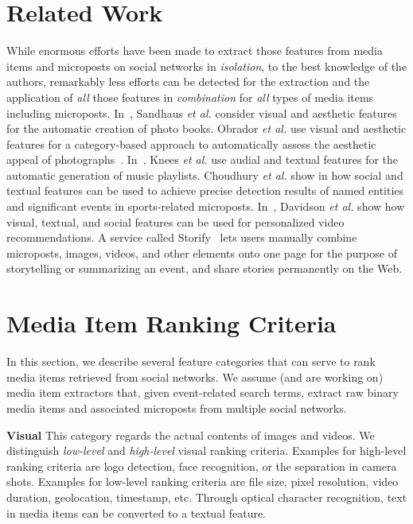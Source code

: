 \documentclass{article}
\begin{document}
\section{Related Work}
While enormous efforts have been made to extract those features
from media items and microposts on social networks in \emph{isolation},
to the best knowledge of the authors, remarkably less efforts 
can be detected for the extraction and the application
of \emph{all} those features in \emph{combination}
for \emph{all} types of media items including microposts.
In~\cite{Photo2011}, Sandhaus \emph{et al.} consider visual and
aesthetic features for the automatic creation of photo books.
Obrador \emph{et al.} use visual and aesthetic features
for a category-based approach to automatically assess
the aesthetic appeal of photographs~\cite{Photo2012}.
In~\cite{Playlist2006}, Knees \emph{et al.} use audial and textual
features for the automatic generation of music playlists.
Choudhury \emph{et al.} show in \cite{Sports2011} how social and textual
features can be used to achieve precise detection results 
of named entities and significant events in sports-related microposts.
In~\cite{YouTube2010}, Davidson \emph{et al.} show how visual,
textual, and social features can be used for personalized video recommendations.
A service called Storify~\cite{Storify2011} lets users manually combine
microposts, images, videos, and other elements onto one page for the purpose
of storytelling or summarizing an event,
and share stories permanently on the Web.

\section{Media Item Ranking Criteria}
In this section, we describe several feature categories that can serve to rank
media items retrieved from social networks. 
We assume (and are working on) media item extractors that,
given event-related search terms,
extract raw binary media items and associated microposts
from multiple social networks.

\noindent \textbf{Visual}
This category regards the actual contents of images and videos.
We distinguish \emph{low-level} and \emph{high-level} visual ranking criteria.
Examples for high-level ranking criteria are logo detection,
face recognition, or the separation in camera shots.
Examples for low-level ranking criteria are file size, pixel resolution,
video duration, geolocation, timestamp, etc.
Through optical character recognition,
text in media items can be converted to a textual feature.
\end{document}
